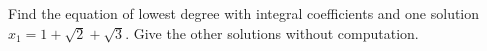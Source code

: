 Find the equation of lowest degree with integral coefficients and one solution $x_1 = 1 + \sqrt{2} + \sqrt{3}$. Give the other solutions without computation.
